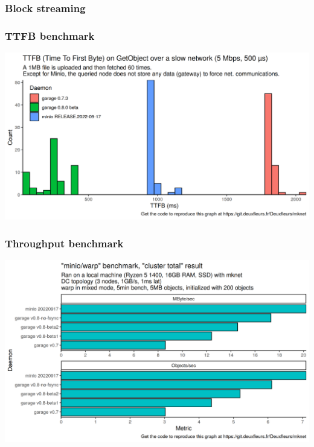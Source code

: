 \documentclass[aspectratio=169,xcolor={svgnames}]{beamer}
\begin{document}
\begin{frame}
	\frametitle{Block streaming}
	\begin{center}
	\end{center}
\end{frame}

\begin{frame}
	\frametitle{TTFB benchmark}
	\begin{center}
		\includegraphics[width=.8\linewidth]{../assets/perf/ttfb.png}
	\end{center}
\end{frame}

\begin{frame}
	\frametitle{Throughput benchmark}
	\begin{center}
		\includegraphics[width=.7\linewidth]{../assets/perf/io-0.7-0.8-minio.png}
	\end{center}
\end{frame}
\end{document}
